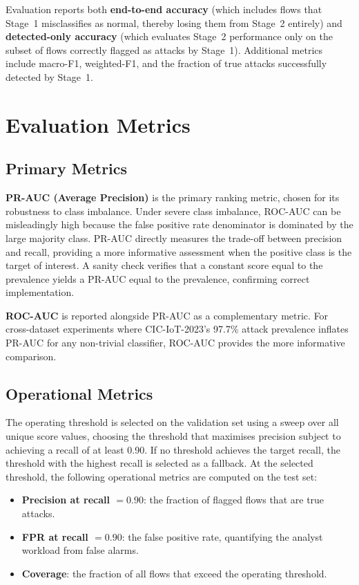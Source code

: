 \documentclass[12pt,a4paper]{report}
\begin{document}
Evaluation reports both \textbf{end-to-end accuracy} (which includes flows that Stage~1 misclassifies as normal, thereby losing them from Stage~2 entirely) and \textbf{detected-only accuracy} (which evaluates Stage~2 performance only on the subset of flows correctly flagged as attacks by Stage~1). Additional metrics include macro-F1, weighted-F1, and the fraction of true attacks successfully detected by Stage~1.

\section{Evaluation Metrics}
\label{sec:metrics}

\subsection{Primary Metrics}
\label{sec:primary-metrics}

\textbf{PR-AUC (Average Precision)} is the primary ranking metric, chosen for its robustness to class imbalance. Under severe class imbalance, ROC-AUC can be misleadingly high because the false positive rate denominator is dominated by the large majority class. PR-AUC directly measures the trade-off between precision and recall, providing a more informative assessment when the positive class is the target of interest. A sanity check verifies that a constant score equal to the prevalence yields a PR-AUC equal to the prevalence, confirming correct implementation.

\textbf{ROC-AUC} is reported alongside PR-AUC as a complementary metric. For cross-dataset experiments where CIC-IoT-2023's 97.7\% attack prevalence inflates PR-AUC for any non-trivial classifier, ROC-AUC provides the more informative comparison.

\subsection{Operational Metrics}
\label{sec:operational-metrics}

The operating threshold is selected on the validation set using a sweep over all unique score values, choosing the threshold that maximises precision subject to achieving a recall of at least 0.90. If no threshold achieves the target recall, the threshold with the highest recall is selected as a fallback. At the selected threshold, the following operational metrics are computed on the test set:

\begin{itemize}
  \item \textbf{Precision at recall $= 0.90$}: the fraction of flagged flows that are true attacks.
  \item \textbf{FPR at recall $= 0.90$}: the false positive rate, quantifying the analyst workload from false alarms.
  \item \textbf{Coverage}: the fraction of all flows that exceed the operating threshold.
\end{itemize}
\end{document}
